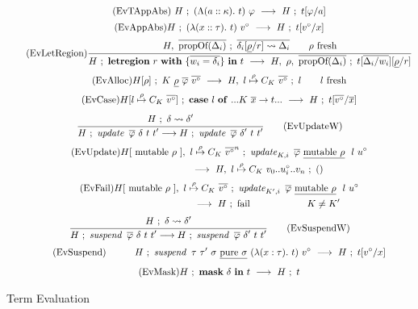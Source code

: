 \begin{figure}[ht!]
\begin{gather*}
	\tag{EvTAppAbs}
		\ H \ ; \ (\Lambda (a :: \kappa). \ t) \ \varphi 
			\ \eto \
		H \ ; \ t[\varphi/a] 
\\[0.5ex]
	\tag{EvAppAbs}
		H \ ; \ (\lambda (x :: \tau). \ t) \ v^\circ 
			\ \eto \
		H \ ; \ t[v^\circ/x] 
\\[0.5ex]
 	\tag{EvLetRegion}	
	\frac	{ H, \ \ov{\rpropOf(\Delta_i)} \ ; \ \ov{\delta_i[\un{\rho}/r] \leadsto \Delta_i} 
		  \qq \rho \ \textrm{fresh}
		}
		{ \begin{aligned} 
	  		 	H \	 ; \ \kletregion \ r \ \kwith \ \{ \ov{w_i = \delta_i} \} \ \kin \ t 
	  	\ \eto \	 H, \ \rho, \ \ov{\rpropOf(\Delta_i)} \
	 			 	; \ t[\ov{\Delta_i/w_i}][\un{\rho}/r] 
	  	\end{aligned}
		}
\\[0.5ex]
	\tag{EvAlloc}			
	H[\rho] \ ; \ K \ \un{\rho} \ \ov{\varphi} \ \ov{v^\circ}
		\ \eto \
	H, \ l \mtoa{\rho} C_K \ \ov{v^\circ} \ ; \ l \qq l \ \trm{fresh}
\\[0.5ex]
	\tag{EvCase}
	H[l \mtoa{\rho} C_K \ \ov{v^\circ}] \ 
		; \ \kcase \ l \ \kof \ ... K \ \ov{x} \to t ... 
		\ \eto \  
	H \ ; \ t[\ov{v^\circ} / \ov{x}] 
\\[1ex]
	\ruleI	{EvUpdateW}
		{H \ ; \ \delta \leadsto \delta'}
		{H \ ; \ \iupdate \ \ov{\varphi} \ \delta \ t \ t' 
			\longrightarrow H \ ; \ \iupdate \ \ov{\varphi} \ \delta' \ t \ t'}
\\[0.5ex]
	\tag{EvUpdate}
 	H[\ \rmutable \ \rho \ ], \ l \mtoa{\rho} C_K \ \ov{v^\circ}^n
				 \ ; \ \iupdate_{K,i} \ \ov{\varphi} \ \un{\rmutable \ \rho} \ \ l \ u^\circ \\
	\hspace{10em}
	  \ \eto \ 	H, \ l \mtoa{\rho} C_K \ v_0 .. u_i^\circ.. v_n
				 \ ; \ ()
\\[0.5ex]
	\tag{EvFail}
 	H[\ \rmutable \ \rho \ ], \ l \mtoa{\rho} C_K \ \ov{v^\circ}
				 \ ; \ \iupdate_{K',i} \ \ov{\varphi} \ \un{\rmutable \ \rho} \ \ l \ u^\circ \\
	\hspace{12em}
	  \ \eto \ 	H \ ; \ \trm{fail}
	\qq\qq\qq K \ne K'
\\[0.5ex]
	\ruleI	{EvSuspendW}
		{H \ ; \ \delta \leadsto \delta'}
		{H \ ; \ \isuspend \ \ov{\varphi} \ \delta \ t \ t' 
			\longrightarrow H \ ; \ \isuspend \ \ov{\varphi} \ \delta' \ t \ t'}
\\[0.5ex]
	\tag{EvSuspend}
	\qq \ \ \ 
	H \ ; \ \isuspend \ \tau \ \tau' \ \sigma \ \un{\rpure \ \sigma} \ (\lambda (x : \tau). \ t) \ v^\circ 
	 	\ \eto \
	H \ ; \ t [v^\circ / x]
\\[1ex]
	\tag{EvMask}
	H \ ; \ \kmask \ \delta \ \kin \ t 
		\ \eto \ H \ ; \ t
\end{gather*}
\vspace{-2em}
\caption{Term Evaluation}
\label{fig:term-evaluation}
\end{figure}
